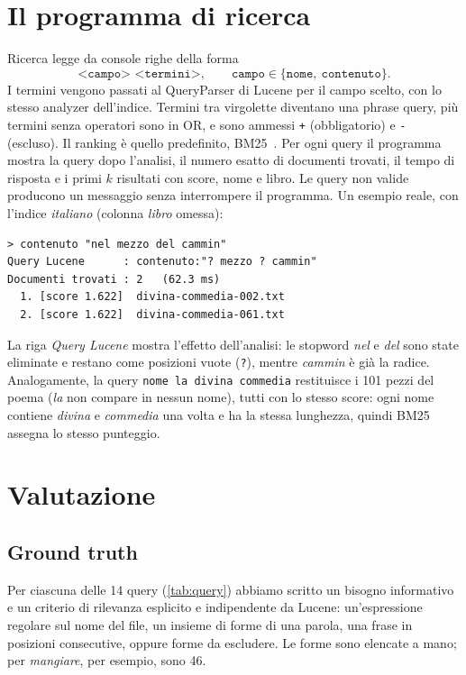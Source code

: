 \documentclass[10pt,a4paper,twocolumn]{article}
\newcommand{\cls}[1]{\textsf{#1}}
\begin{document}
\section{Il programma di ricerca}
\cls{Ricerca} legge da console righe della forma
\[
\texttt{<campo> <termini>},\qquad \texttt{campo}\in\{\texttt{nome},\ \texttt{contenuto}\}.
\]
I termini vengono passati al \cls{QueryParser} di Lucene per il campo scelto, con lo stesso analyzer
dell'indice. Termini tra virgolette diventano una phrase query, più termini senza operatori sono in OR, e sono
ammessi \texttt{+} (obbligatorio) e \texttt{-} (escluso). Il ranking è quello predefinito, BM25~\cite{robertson2009}.
Per ogni query il programma mostra la query dopo l'analisi, il numero esatto di documenti trovati, il tempo di risposta e i primi $k$ risultati con
score, nome e libro. Le query non valide producono un messaggio senza interrompere il programma.
Un esempio reale, con l'indice \emph{italiano} (colonna \emph{libro} omessa):

\smallskip\noindent\begin{minipage}{\columnwidth}
\begin{lstlisting}
> contenuto "nel mezzo del cammin"
Query Lucene      : contenuto:"? mezzo ? cammin"
Documenti trovati : 2   (62.3 ms)
  1. [score 1.622]  divina-commedia-002.txt
  2. [score 1.622]  divina-commedia-061.txt
\end{lstlisting}
\end{minipage}\smallskip

\noindent
La riga \emph{Query Lucene} mostra l'effetto dell'analisi: le stopword \emph{nel} e \emph{del} sono state
eliminate e restano come posizioni vuote (\texttt{?}), mentre \emph{cammin} è già la radice. Analogamente, la
query \texttt{nome la divina commedia} restituisce i 101 pezzi del poema (\emph{la} non compare in nessun nome),
tutti con lo stesso score: ogni nome contiene \emph{divina} e \emph{commedia} una volta e ha la stessa
lunghezza, quindi BM25 assegna lo stesso punteggio.

\section{Valutazione}

\subsection{Ground truth}
Per ciascuna delle 14 query (\cref{tab:query}) abbiamo scritto un bisogno informativo e un criterio di
rilevanza esplicito e indipendente da Lucene: un'espressione regolare sul nome del file, un insieme di forme
di una parola, una frase in posizioni consecutive, oppure forme da escludere. Le forme sono elencate a mano;
per \emph{mangiare}, per esempio, sono 46.
\end{document}
